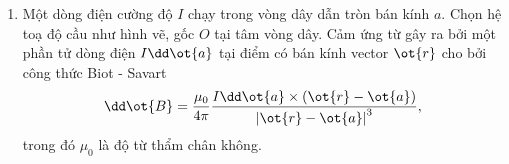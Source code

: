 \begin{vd}
    \begin{enumerate}[1)]
        \item Một dòng điện cường độ $I$ chạy trong vòng dây dẫn tròn bán kính $a$. Chọn hệ toạ độ cầu như hình vẽ, gốc $O$ tại tâm vòng dây. Cảm ứng từ gây ra bởi một phần tử dòng điện $I \dd\ot{a}$ tại điểm có bán kính vector $\ot{r}$ cho bởi công thức Biot - Savart 
        \[\dd\ot{B}=\dfrac{{{\mu }_{0}}}{4\pi }\dfrac{I\dd\ot{a}\times \left( \ot{r}-\ot{a} \right)}{{{\left| \ot{r}-\ot{a} \right|}^{3}}},\] trong đó ${{\mu }_{0}}$ là độ từ thẩm chân không.
        \begin{center}
            


\begin{tikzpicture}[x=0.75pt,y=0.75pt,yscale=-1,xscale=1]


\end{tikzpicture}
\end{center}
\end{enumerate}
\end{vd}

